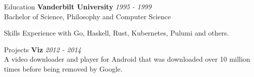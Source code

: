 \documentclass{resume} %
\begin{document}
\begin{rSection}{Education}
{\bf Vanderbilt University} \hfill {\em 1995 - 1999}
\\ Bachelor of Science, Philosophy and Computer Science
\end{rSection}


\begin{rSection}{Skills}
Experience with Go, Haskell, Rust, Kubernetes, Pulumi and others.
\end{rSection}

\begin{rSection}{Projects}
	{\bf Viz} \hfill {\em 2012 - 2014}
\\ A video downloader and player for Android that was downloaded over 10 million times before being removed by Google.
\end{rSection}
\end{document}
